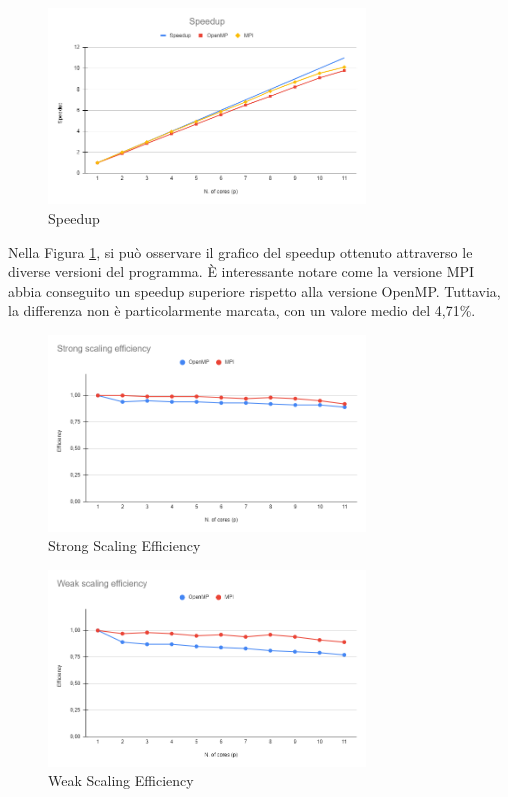 \documentclass[a4paper,12pt, oneside]{article}
\begin{document}
\begin{figure}[h]
    \centering
    \includegraphics[width=0.75\textwidth]{speedup.png}
    \caption{Speedup}
    \label{fig:speedup}
\end{figure}

Nella Figura \ref{fig:speedup}, si può osservare il grafico del speedup ottenuto attraverso
le diverse versioni del programma. È interessante notare come la versione MPI abbia
conseguito un speedup superiore rispetto alla versione OpenMP. Tuttavia, la differenza non
è particolarmente marcata, con un valore medio del 4,71\%.

\begin{figure}[h!]
    \centering
    \includegraphics[width=0.75\textwidth]{strong-scaling.png}
    \caption{Strong Scaling Efficiency}
    \label{fig:strong-scaling}
\end{figure}

\begin{figure}[h!]
    \centering
    \includegraphics[width=0.75\textwidth]{weak-scaling.png}
    \caption{Weak Scaling Efficiency}
    \label{fig:weak-scaling}
\end{figure}
\end{document}
